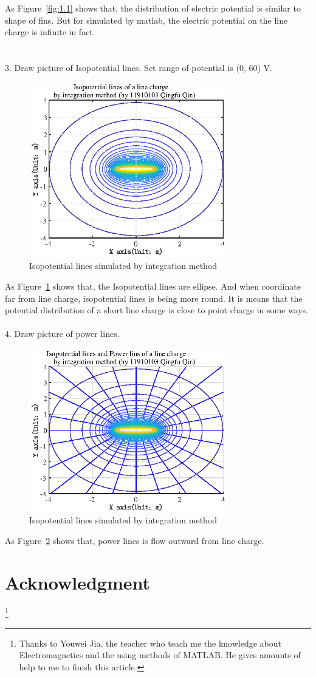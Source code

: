 \documentclass[10pt, journal, final]{IEEEtran}
\begin{document}
As Figure~\ref{fig:1.1} shows that,
the distribution of electric potential is similar to shape of fins.
But for simulated by matlab,
the electric potential on the line charge is infinite in fact.\\
\\
\\
3. Draw picture of Isopotential lines.
Set range of potential is (0, 60) V.

\begin{figure}[htbp]
    \centering
    \includegraphics[width = 3.4in]{figures/fig1.2.eps}
    \caption{Isopotential lines simulated by integration method}
    \label{fig:1.2}
\end{figure}
As Figure~\ref{fig:1.2} shows that, the Isopotential lines are ellipse.
And when coordinate far from line charge, isopotential lines is being more round.
It is means that the potential distribution of a short line charge
is close to point charge in some ways.\\
\\
4. Draw picture of power lines.

\begin{figure}[htbp]
    \centering
    \includegraphics[width = 3.4in]{figures/fig1.3.eps}
    \caption{Isopotential lines simulated by integration method}
    \label{fig:1.3}
\end{figure}
As Figure~\ref{fig:1.3} shows that, power lines is flow outward from line charge.

\section*{Acknowledgment}
\thanks{
    Thanks to Youwei Jia, the teacher who teach me the knowledge about Electromagnetics
    and the using methods of MATLAB. He gives amounts of help to me to finish this article.
}
\end{document}
